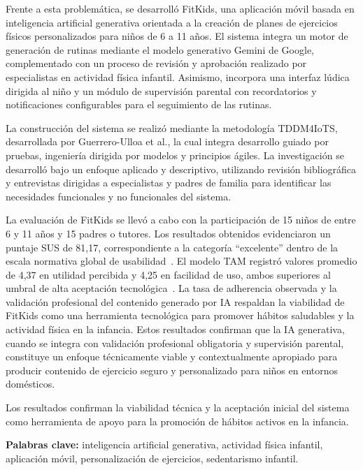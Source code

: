 \documentclass[12pt,a4paper,oneside]{report}
\begin{document}
		Frente a esta problemática, se desarrolló FitKids, una aplicación móvil basada en inteligencia artificial generativa orientada a la creación de planes de ejercicios físicos personalizados para niños de 6 a 11 años. El sistema integra un motor de generación de rutinas mediante el modelo generativo Gemini de Google, complementado con un proceso de revisión y aprobación realizado por especialistas en actividad física infantil. Asimismo, incorpora una interfaz lúdica dirigida al niño y un módulo de supervisión parental con recordatorios y notificaciones configurables para el seguimiento de las rutinas.
		
		La construcción del sistema se realizó mediante la metodología TDDM4IoTS, desarrollada por Guerrero-Ulloa et al., la cual integra desarrollo guiado por pruebas, ingeniería dirigida por modelos y principios ágiles. La investigación se desarrolló bajo un enfoque aplicado y descriptivo, utilizando revisión bibliográfica y entrevistas dirigidas a especialistas y padres de familia para identificar las necesidades funcionales y no funcionales del sistema.
		
		La evaluación de FitKids se llevó a cabo con la participación de 15 niños de entre 6 y 11 años y 15 padres o tutores. Los resultados obtenidos evidenciaron un puntaje SUS de 81,17, correspondiente a la categoría ``excelente'' dentro de la escala normativa global de usabilidad~\cite{Bangor2008}. El modelo TAM registró valores promedio de 4,37 en utilidad percibida y 4,25 en facilidad de uso, ambos superiores al umbral de alta aceptación tecnológica~\cite{Venkatesh2003}. La tasa de adherencia observada y la validación profesional del contenido generado por IA respaldan la viabilidad de FitKids como una herramienta tecnológica para promover hábitos saludables y la actividad física en la infancia. Estos resultados confirman que la IA generativa, cuando se integra con validación profesional obligatoria y supervisión parental, constituye un enfoque técnicamente viable y contextualmente apropiado para producir contenido de ejercicio seguro y personalizado para niños en entornos domésticos.
		
		Los resultados confirman la viabilidad técnica y la aceptación inicial del sistema como herramienta de apoyo para la promoción de hábitos activos en la infancia.
		
		\vspace{0.5cm}
		\noindent\textbf{Palabras clave:} inteligencia artificial generativa, actividad física infantil, aplicación móvil, personalización de ejercicios, sedentarismo infantil.
		\clearpage
		
\end{document}
